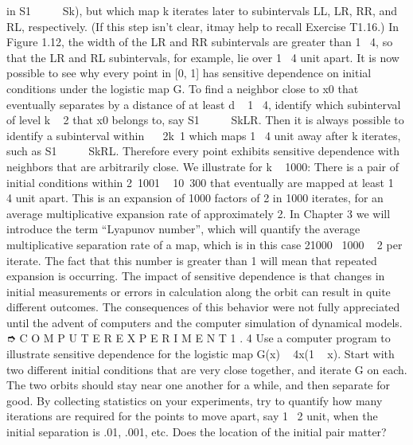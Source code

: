 \documentclass{article}
\begin{document}
in S1       Sk), but which map k iterates later to subintervals LL, LR, RR, and RL,
respectively. (If this step isn’t clear, itmay help to recall Exercise T1.16.) In Figure
1.12, the width of the LR and RR subintervals are greater than 1  4, so that the
LR and RL subintervals, for example, lie over 1  4 unit apart.
It is now possible to see why every point in [0, 1] has sensitive dependence
on initial conditions under the logistic map G. To find a neighbor close to x0 that
eventually separates by a distance of at least d   1  4, identify which subinterval
of level k   2 that x0 belongs to, say S1       SkLR. Then it is always possible to
identify a subinterval within    2k 1 which maps 1  4 unit away after k iterates,
such as S1       SkRL. Therefore every point exhibits sensitive dependence with
neighbors that are arbitrarily close.
We illustrate for k   1000: There is a pair of initial conditions within
2 1001   10 300 that eventually are mapped at least 1  4 unit apart. This is an
expansion of 1000 factors of 2 in 1000 iterates, for an average multiplicative
expansion rate of approximately 2. In Chapter 3 we will introduce the term
“Lyapunov number”, which will quantify the average multiplicative separation
rate of a map, which is in this case 21000  1000   2 per iterate. The fact that this
number is greater than 1 will mean that repeated expansion is occurring.
The impact of sensitive dependence is that changes in initial measurements
or errors in calculation along the orbit can result in quite different outcomes. The
consequences of this behavior were not fully appreciated until the advent of
computers and the computer simulation of dynamical models.
➮ C O M P U T E R E X P E R I M E N T 1 . 4
Use a computer program to illustrate sensitive dependence for the logistic
map G(x)   4x(1   x). Start with two different initial conditions that are very
close together, and iterate G on each. The two orbits should stay near one
another for a while, and then separate for good. By collecting statistics on your
experiments, try to quantify how many iterations are required for the points to
move apart, say 1  2 unit, when the initial separation is .01, .001, etc. Does the
location of the initial pair matter?
\end{document}
